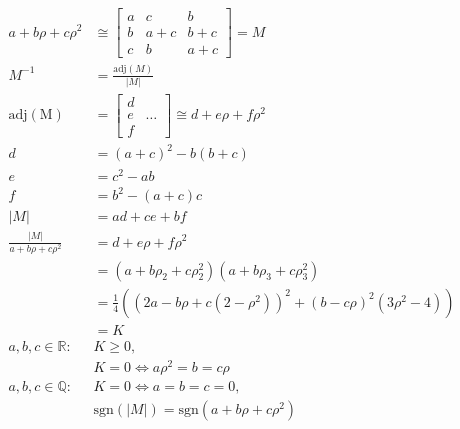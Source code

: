 \documentclass{article}
\begin{document}
\begin{align*}
  a+b\rho+c\rho^2 &\cong
  \begin{bmatrix}
    a & c & b \\
    b & a+c & b+c \\
    c & b & a+c
  \end{bmatrix} = M \\
  M^{-1} &= \frac{\mathrm{adj}(M)}{\lvert M \rvert} \\
  \mathrm{adj(M)} &=
  \begin{bmatrix}
    d & \\
    e & \hdots \\
    f &
  \end{bmatrix}
  \cong d+e\rho+f\rho^2 \\
  d &=
  (a+c)^2-b(b+c) \\
  e &=
  c^2-ab \\
  f &=
  b^2-(a+c)c \\
  \lvert M \rvert &= ad+ce+bf \\
  \frac{\lvert M \rvert}{a+b\rho+c\rho^2}
  &= d+e\rho+f\rho^2 \\
  &= (a+b\rho_2+c\rho_2^2)(a+b\rho_3+c\rho_3^2) \\
  &= \frac{1}{4}\left((2a-b\rho+c(2-\rho^2))^2+(b-c\rho)^2(3\rho^2-4)\right) \\
  &= K \\
  a, b, c \in \mathbb{R}: & K \geq 0, \\
  & K = 0 \iff a\rho^2 = b = c\rho \\
  a, b, c \in \mathbb{Q}: & K = 0 \iff a = b = c = 0, \\
  & \mathrm{sgn}(\lvert M \rvert) = \mathrm{sgn}(a+b\rho+c\rho^2)
\end{align*}
\end{document}
